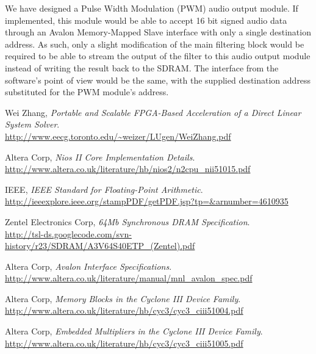 \documentclass[]{article}
\begin{document}
We have designed a Pulse Width Modulation (PWM) audio output module. If implemented, this module would be able to accept 16 bit signed audio data through an Avalon Memory-Mapped Slave interface with only a single destination address.
As such, only a slight modification of the main filtering block would be required to be able to stream the output of the filter to this audio output module instead of writing the result back to the SDRAM.
The interface from the software's point of view would be the same, with the supplied destination address substituted for the PWM module's address.



\clearpage

\begin{thebibliography}{9}
	Wei Zhang,
	\emph{Portable and Scalable FPGA-Based Acceleration of a Direct Linear System Solver}. \\
	\url{http://www.eecg.toronto.edu/~weizer/LUgen/WeiZhang.pdf}

	Altera Corp,
	\emph{Nios II Core Implementation Details}. \\
	\url{http://www.altera.co.uk/literature/hb/nios2/n2cpu_nii51015.pdf}

	IEEE,
	\emph{IEEE Standard for Floating-Point Arithmetic}. \\
	\url{http://ieeexplore.ieee.org/stampPDF/getPDF.jsp?tp=&arnumber=4610935}

	Zentel Electronics Corp,
	\emph{64Mb Synchronous DRAM Specification}. \\
	\url{http://tsl-ds.googlecode.com/svn-history/r23/SDRAM/A3V64S40ETP_(Zentel).pdf}

	Altera Corp,
	\emph{Avalon Interface Specifications}. \\
	\url{http://www.altera.co.uk/literature/manual/mnl_avalon_spec.pdf}

	Altera Corp,
	\emph{Memory Blocks in the Cyclone III Device Family}. \\
	\url{http://www.altera.co.uk/literature/hb/cyc3/cyc3_ciii51004.pdf}

	Altera Corp,
	\emph{Embedded Multipliers in the Cyclone III Device Family}. \\
	\url{http://www.altera.co.uk/literature/hb/cyc3/cyc3_ciii51005.pdf}


\end{thebibliography}
\end{document}
